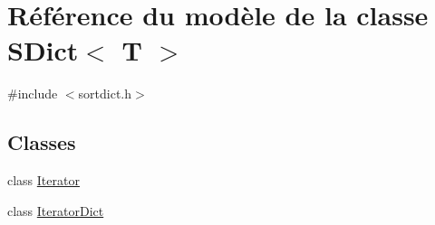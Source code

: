 \hypertarget{class_s_dict}{}\section{Référence du modèle de la classe S\+Dict$<$ T $>$}
\label{class_s_dict}


{\ttfamily \#include $<$sortdict.\+h$>$}

\subsection*{Classes}
\begin{DoxyCompactItemize}
\item 
class \hyperlink{class_s_dict_1_1_iterator}{Iterator}
\item 
class \hyperlink{class_s_dict_1_1_iterator_dict}{Iterator\+Dict}
\end{DoxyCompactItemize}
